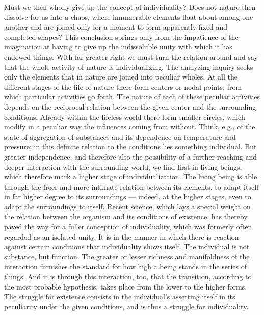 \documentclass[12pt,a4paper,openany]{book}
\newcommand{\opage}[1]{\marginnote{\footnotesize\textit{[#1]}}}
\begin{document}
Must we then wholly give up the concept of individuality? Does not nature then
dissolve for us into a chaos, where innumerable elements float about among one
another and are joined only for a moment to form apparently fixed and
completed shapes? \opage{111}This conclusion springs only from the impatience
of the imagination at having to give up the indissoluble unity with which it
has endowed things. With far greater right we must turn the relation around
and say that the whole activity of nature is individualizing. %
The analyzing inquiry seeks only the elements that in nature are joined into
peculiar wholes. At all the different stages of the life of nature there form
centers or nodal points, from which particular activities go forth. The nature
of each of these peculiar activities depends on the reciprocal relation
between the given center and the surrounding conditions. Already within the
lifeless world there form smaller circles, which modify in a peculiar way the
influences coming from without. Think, e.g., of the state of aggregation of
substances and its dependence on temperature and pressure; in this definite
relation to the conditions lies something individual. But greater
independence, and therefore also the possibility of a further-reaching and
deeper interaction with the surrounding world, we find first in living beings,
which therefore mark a higher stage of individualization. The living being is
able, through the freer and more intimate relation between its elements, to
adapt itself in far higher degree to its surroundings --- indeed, at the
higher stages, even to adapt the surroundings to itself. Recent science, which
lays a special weight on the relation between the organism and its conditions
of existence, has thereby paved the way for a fuller conception of
individuality, which was formerly often regarded as an \opage{112}isolated
unity. It is in the manner in which there is reaction against certain
conditions that individuality shows itself. The individual is not substance,
but function. The greater or lesser richness and manifoldness of the
interaction furnishes the standard for how high a being stands in the series
of things. And it is through this interaction, too, that the transition,
according to the most probable hypothesis, takes place from the lower to the
higher forms. The struggle for existence consists in the individual's
asserting itself in its peculiarity under the given conditions, and is thus a
struggle for individuality.
\end{document}
